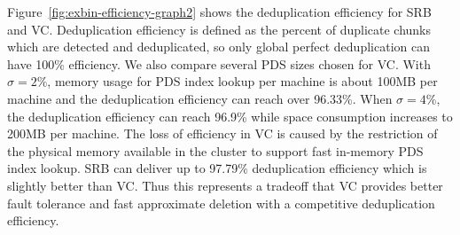 Figure~\ref{fig:exbin-efficiency-graph2} shows the deduplication efficiency for SRB and VC.
Deduplication efficiency is defined as the percent of duplicate chunks
which are detected and deduplicated, so only global perfect deduplication can have 100\% efficiency.
 We also compare several PDS sizes chosen for VC.
With $\sigma=2\%$, memory usage for PDS index lookup per machine is about 100MB per machine
and  the deduplication efficiency can reach over 96.33\%.
When $\sigma=4\%$, the deduplication efficiency can reach 96.9\% while space consumption increases to 200MB per machine. 
The loss of efficiency in VC is caused by the restriction of the physical memory available
in the cluster to support fast in-memory PDS index lookup. 
SRB can deliver up to 97.79\% deduplication efficiency which is slightly better than VC.
Thus this represents a tradeoff that VC provides better fault tolerance and fast approximate deletion
with a competitive deduplication efficiency.


